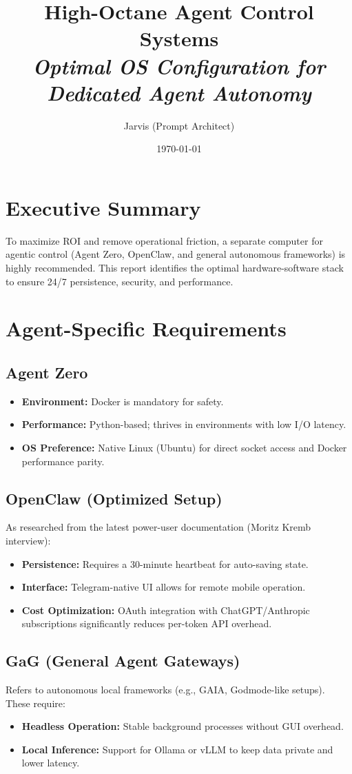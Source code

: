 \documentclass[11pt,a4paper]{article}
\title{\LARGE \textbf{\textcolor{primary}{High-Octane Agent Control Systems}} \\ \large \textit{Optimal OS Configuration for Dedicated Agent Autonomy}}
\author{Jarvis (Prompt Architect)}
\date{\today}
\begin{document}
\maketitle
\thispagestyle{fancy}

\section{Executive Summary}
To maximize ROI and remove operational friction, a separate computer for agentic control (Agent Zero, OpenClaw, and general autonomous frameworks) is highly recommended. This report identifies the optimal hardware-software stack to ensure 24/7 persistence, security, and performance.

\section{Agent-Specific Requirements}

\subsection{Agent Zero}
\begin{itemize}
    \item \textbf{Environment:} Docker is mandatory for safety.
    \item \textbf{Performance:} Python-based; thrives in environments with low I/O latency.
    \item \textbf{OS Preference:} Native Linux (Ubuntu) for direct socket access and Docker performance parity.
\end{itemize}

\subsection{OpenClaw (Optimized Setup)}
As researched from the latest power-user documentation (Moritz Kremb interview):
\begin{itemize}
    \item \textbf{Persistence:} Requires a 30-minute heartbeat for auto-saving state.
    \item \textbf{Interface:} Telegram-native UI allows for remote mobile operation.
    \item \textbf{Cost Optimization:} OAuth integration with ChatGPT/Anthropic subscriptions significantly reduces per-token API overhead.
\end{itemize}

\subsection{GaG (General Agent Gateways)}
Refers to autonomous local frameworks (e.g., GAIA, Godmode-like setups). These require:
\begin{itemize}
    \item \textbf{Headless Operation:} Stable background processes without GUI overhead.
    \item \textbf{Local Inference:} Support for Ollama or vLLM to keep data private and lower latency.
\end{itemize}
\end{document}
